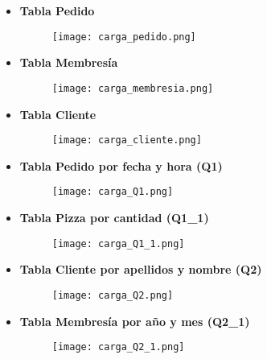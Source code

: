 \documentclass[a4paper]{article}
\begin{document}
\begin{itemize}
    \item \textbf{\large{Tabla Pedido}}

    \begin{figure}[H]
        \texttt{[image: carga\_pedido.png]}
        \label{fig:carga_pedido}
    \end{figure}

    \item \textbf{\large{Tabla Membresía}}

    \begin{figure}[H]
        \texttt{[image: carga\_membresia.png]}
        \label{fig:carga_membresia}
    \end{figure}

    \item \textbf{\large{Tabla Cliente}}

    \begin{figure}[H]
        \texttt{[image: carga\_cliente.png]}
        \label{fig:carga_cliente}
    \end{figure}

    \item \textbf{\large{Tabla Pedido por fecha y hora (Q1)}}

    \begin{figure}[H]
        \texttt{[image: carga\_Q1.png]}
        \label{fig:carga_Q1}
    \end{figure}

    \item \textbf{\large{Tabla Pizza por cantidad (Q1\_1)}}

    \begin{figure}[H]
        \texttt{[image: carga\_Q1\_1.png]}
        \label{fig:carga_Q1_1}
    \end{figure}

    \item \textbf{\large{Tabla Cliente por apellidos y nombre (Q2)}}

    \begin{figure}[H]
        \texttt{[image: carga\_Q2.png]}
        \label{fig:carga_Q2}
    \end{figure}

    \item \textbf{\large{Tabla Membresía por año y mes (Q2\_1)}}

    \begin{figure}[H]
        \texttt{[image: carga\_Q2\_1.png]}
        \label{fig:carga_Q2_1}
    \end{figure}


\end{itemize}
\end{document}
